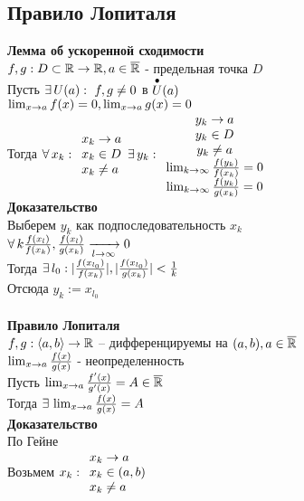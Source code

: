 \documentclass[12pt]{article}
\begin{document}
\subsection{Правило Лопиталя}
\textbf{Лемма об ускоренной сходимости}\\
$f, g: D \subset \mathbb{R} \rightarrow \mathbb{R}, a\in \overline{\mathbb{R}}$ - предельная точка $D$\\
Пусть $\exists\, U(a):\ f,g\neq 0$ в $\overset{\bullet}{U}(a)$\\
$\lim_{x\rightarrow a} f(x) = 0, \lim_{x\rightarrow a} g(x) = 0$\\
Тогда $\forall\, x_k: \begin{array}{l}
     x_k \rightarrow a\\
     x_k \in D\\
     x_k \neq a
\end{array} \exists\, y_k: \begin{array}{cc}
     y_k \rightarrow a\\
     y_k \in D\\
     y_k \neq a\\
     \lim_{k \rightarrow \infty} \frac{f(y_k)}{f(x_k)} = 0\\
     \lim_{k \rightarrow \infty} \frac{f(y_k)}{g(x_k)} = 0
\end{array}$\\
\textbf{Доказательство}\\
Выберем $y_k$ как подпоследовательность $x_k$\\
$\forall\, k \frac{f(x_l)}{f(x_k)},\frac{f(x_l)}{g(x_k)} \xrightarrow[l\rightarrow \infty]{} 0$\\
Тогда $\exists\, l_0: |\frac{f(x_{l_0})}{f(x_k)}|,|\frac{f(x_{l_0})}{g(x_k)}| < \frac1k$\\
Отсюда $y_k := x_{l_0}$\\\\
\textbf{Правило Лопиталя}\\
$f,g: \langle a, b \rangle \rightarrow \mathbb{R}$ -- дифференцируемы на $(a,b), a \in \overline{\mathbb{R}}$\\
$\lim_{x\rightarrow a} \frac{f(x)}{g(x)}$ - неопределенность\\
Пусть $\lim_{x\rightarrow a}\frac{f'(x)}{g'(x)} = A \in \overline{\mathbb{R}}$\\
Тогда $\exists\, \lim_{x\rightarrow a} \frac{f(x)}{g(x)} = A$\\
\textbf{Доказательство}\\
По Гейне\\
Возьмем $x_k: \begin{array}{l}
     x_k \rightarrow a\\
     x_k \in (a, b)\\
     x_k \neq a
\end{array}$\\
\end{document}
